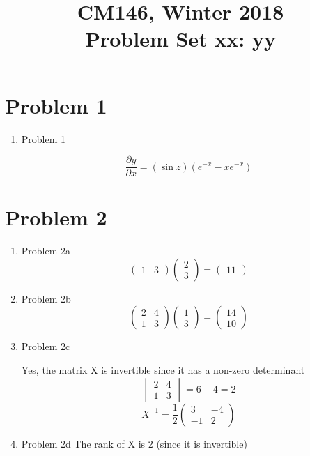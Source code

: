 \documentclass[11pt]{article}
\newcommand{\cnum}{CM146}
\newcommand{\ced}{Winter 2018}
\newcommand{\ctitle}[3]{\title{\vspace{-0.5in}\cnum, \ced\\Problem Set #1: #2}}
\newcommand{\solution}[1]{{{\color{blue}{\bf Solution:} {#1}}}}
\begin{document}
\ctitle{xx}{yy}
\author{}
\date{}
\maketitle
\vspace{-0.75in}

\section{Problem 1}
\begin{enumerate}
\item Problem 1

\solution{}
\[
	\frac{\partial y}{\partial x} = (\sin{z}) (e^{-x} - xe^{-x})
\]
\vspace{10cm}
\end{enumerate}

\newpage
\section{Problem 2}

\begin{enumerate}
\item Problem 2a
\solution{}
$$
\begin{pmatrix}
1 & 3
\end{pmatrix}
\begin{pmatrix}
2 \\
3
\end{pmatrix}
= 
\begin{pmatrix}
11
\end{pmatrix}
$$

\item Problem 2b
\solution{}
$$
\begin{pmatrix}
2 & 4 \\
1 & 3
\end{pmatrix}
\begin{pmatrix}
1 \\
3
\end{pmatrix}
=
\begin{pmatrix}
14 \\
10
\end{pmatrix}
$$

\item Problem 2c
\solution{}

Yes, the matrix X is invertible since it has a non-zero determinant \break
$$
\begin{vmatrix}
2 & 4 \\
1 & 3
\end{vmatrix}
= 6 - 4 = 2 
$$
$$
X^{-1} = \frac{1}{2}
\begin{pmatrix}
3 & -4 \\
-1 & 2
\end{pmatrix}
$$

\item Problem 2d
\solution{}
The rank of X is 2 (since it is invertible)
\end{enumerate}
\end{document}
